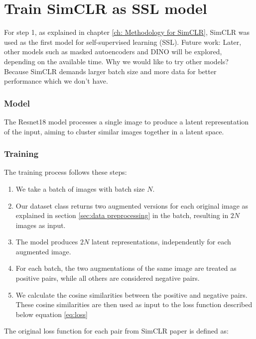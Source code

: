\section{Train SimCLR as SSL model}
For step 1, as explained in chapter \ref{ch: Methodology for SimCLR}, SimCLR was used as the first model for self-supervised learning (SSL). 
Future work: Later, other models such as masked autoencoders and DINO will be explored, depending on the available time.
Why we would like to try other models? Because SimCLR demands larger batch size and more data for better performance which we don't have.



\subsubsection{Model}
The Resnet18 \cite{he2015deepresiduallearningimage} model processes a single image to produce a latent representation of the input, aiming to cluster 
similar images together in a latent space. 

\subsubsection{Training }
The training process follows these steps:

\begin{enumerate}
    \item We take a batch of images with batch size $N$.
    
    \item Our dataset class returns two augmented versions for each original image as explained in section \ref{sec:data preprocessing} in the batch, 
    resulting in $2N$ images as input.

    \item The model produces $2N$ latent representations, independently for each augmented image.

    \item For each batch, the two augmentations of the same image are treated as positive pairs, while all others are considered negative pairs.

    \item We calculate the cosine similarities between the positive and negative pairs. These cosine similarities are then used as input to the loss
     function described below equation \ref{eq:loss}
\end{enumerate}
The original loss function for each pair from SimCLR paper \cite{chen2020simple} is defined as:

